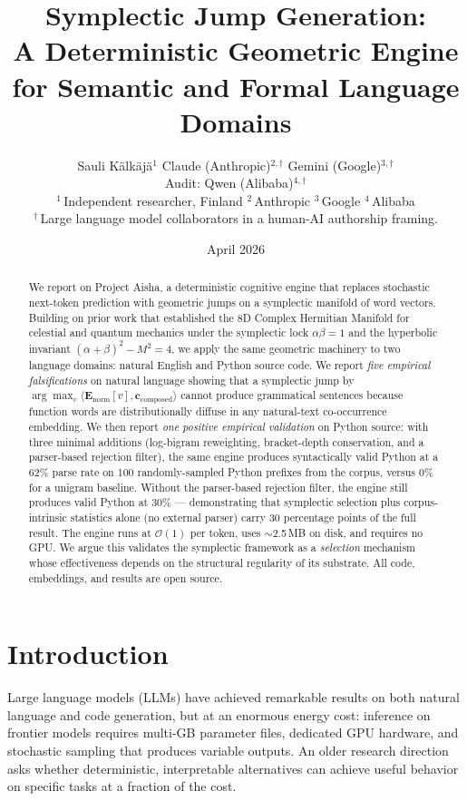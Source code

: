 \documentclass[11pt,a4paper]{article}
\title{\textbf{Symplectic Jump Generation:\\
A Deterministic Geometric Engine for Semantic and Formal Language Domains}}
\author{
Sauli K\"{a}lk\"{a}j\"{a}$^{1}$ \quad
Claude (Anthropic)$^{2, \dagger}$ \quad
Gemini (Google)$^{3, \dagger}$ \\[2pt]
\small Audit: Qwen (Alibaba)$^{4, \dagger}$ \\[4pt]
\small $^{1}$\,Independent researcher, Finland \quad
\small $^{2}$\,Anthropic \quad
\small $^{3}$\,Google \quad
\small $^{4}$\,Alibaba \\[2pt]
\small $^{\dagger}$\,Large language model collaborators in a human-AI authorship framing.
}
\date{April 2026}
\begin{document}
\maketitle

\begin{abstract}
We report on Project Aisha, a deterministic cognitive engine that replaces stochastic next-token prediction with geometric jumps on a symplectic manifold of word vectors. Building on prior work that established the 8D Complex Hermitian Manifold for celestial and quantum mechanics under the symplectic lock $\alpha\beta = 1$ and the hyperbolic invariant $(\alpha + \beta)^2 - M^2 = 4$, we apply the same geometric machinery to two language domains: natural English and Python source code. We report \emph{five empirical falsifications} on natural language showing that a symplectic jump by $\arg\max_{v} \langle \mathbf{E}_{\text{norm}}[v], \mathbf{c}_{\text{composed}}\rangle$ cannot produce grammatical sentences because function words are distributionally diffuse in any natural-text co-occurrence embedding. We then report \emph{one positive empirical validation} on Python source: with three minimal additions (log-bigram reweighting, bracket-depth conservation, and a parser-based rejection filter), the same engine produces syntactically valid Python at a 62\% parse rate on 100 randomly-sampled Python prefixes from the corpus, versus 0\% for a unigram baseline. Without the parser-based rejection filter, the engine still produces valid Python at 30\% — demonstrating that symplectic selection plus corpus-intrinsic statistics alone (no external parser) carry 30 percentage points of the full result. The engine runs at $\mathcal{O}(1)$ per token, uses $\sim$2.5\,MB on disk, and requires no GPU. We argue this validates the symplectic framework as a \emph{selection} mechanism whose effectiveness depends on the structural regularity of its substrate. All code, embeddings, and results are open source.
\end{abstract}

\tableofcontents

\section{Introduction}\label{sec:intro}

Large language models (LLMs) have achieved remarkable results on both natural language and code generation, but at an enormous energy cost: inference on frontier models requires multi-GB parameter files, dedicated GPU hardware, and stochastic sampling that produces variable outputs. An older research direction asks whether deterministic, interpretable alternatives can achieve useful behavior on specific tasks at a fraction of the cost.
\end{document}
